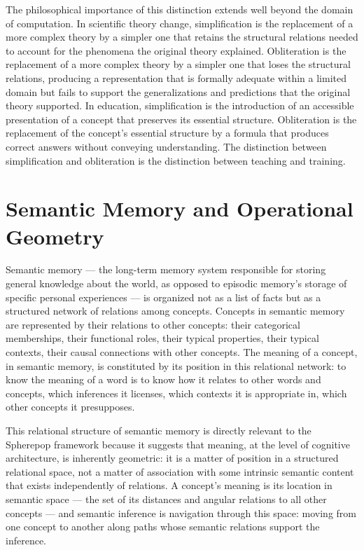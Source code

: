 \documentclass[12pt,openany]{book}
\theoremstyle{plain}
\theoremstyle{definition}
\theoremstyle{remark}
\begin{document}
The philosophical importance of this distinction extends well beyond the domain of computation. In scientific theory change, simplification is the replacement of a more complex theory by a simpler one that retains the structural relations needed to account for the phenomena the original theory explained. Obliteration is the replacement of a more complex theory by a simpler one that loses the structural relations, producing a representation that is formally adequate within a limited domain but fails to support the generalizations and predictions that the original theory supported. In education, simplification is the introduction of an accessible presentation of a concept that preserves its essential structure. Obliteration is the replacement of the concept's essential structure by a formula that produces correct answers without conveying understanding. The distinction between simplification and obliteration is the distinction between teaching and training.

\section{Semantic Memory and Operational Geometry}

Semantic memory — the long-term memory system responsible for storing general knowledge about the world, as opposed to episodic memory's storage of specific personal experiences — is organized not as a list of facts but as a structured network of relations among concepts. Concepts in semantic memory are represented by their relations to other concepts: their categorical memberships, their functional roles, their typical properties, their typical contexts, their causal connections with other concepts. The meaning of a concept, in semantic memory, is constituted by its position in this relational network: to know the meaning of a word is to know how it relates to other words and concepts, which inferences it licenses, which contexts it is appropriate in, which other concepts it presupposes.

This relational structure of semantic memory is directly relevant to the Spherepop framework because it suggests that meaning, at the level of cognitive architecture, is inherently geometric: it is a matter of position in a structured relational space, not a matter of association with some intrinsic semantic content that exists independently of relations. A concept's meaning is its location in semantic space — the set of its distances and angular relations to all other concepts — and semantic inference is navigation through this space: moving from one concept to another along paths whose semantic relations support the inference.
\end{document}
